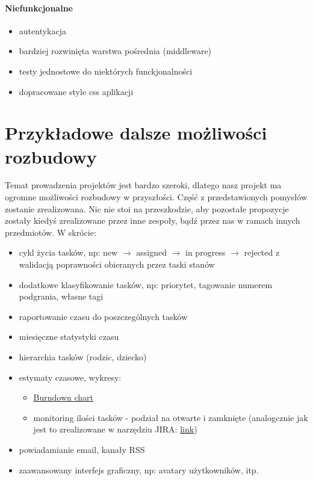 \documentclass[a4paper,12pt,notitlepage]{mwrep}
\begin{document}
\paragraph{Niefunkcjonalne}
\begin{itemize}
	\item	autentykacja
	\item	bardziej rozwinięta warstwa pośrednia (middleware)
	\item	testy jednostowe do niektórych funckjonalności
	\item	dopracowane style css aplikacji
\end{itemize}




\section{Przykładowe dalsze możliwości rozbudowy}
Temat prowadzenia projektów jest bardzo szeroki, dlatego nasz projekt ma ogromne możliwości
rozbudowy w przyszłości. Część z przedstawionych pomysłów zostanie zrealizowana.
Nic nie stoi na przeszkodzie, aby pozostałe propozycje zostały kiedyś zrealizowane przez
inne zespoły, bądź przez nas w ramach innych przedmiotów. W skrócie:
\begin{itemize}
	\item	cykl życia tasków, np: new $\rightarrow$ assigned $\rightarrow$ in progress $\rightarrow$ rejected
			z walidacją poprawności obieranych przez taski stanów
	\item	dodatkowe klasyfikowanie tasków, np: priorytet, tagowanie numerem podgrania, własne tagi
	\item	raportowanie czasu do poszczególnych tasków
	\item	miesięczne statystyki czasu
	\item	hierarchia tasków (rodzic, dziecko)
	\item	estymaty czasowe, wykresy:
			\begin{itemize}
				\item	\href{http://www.youtube.com/watch?v=XU0llRltyFM&t=4m29s}{Burndown chart}
				\item	monitoring ilości tasków - podział na otwarte i zamknięte (analogcznie jak jest to zrealizowane w narzędziu JIRA:
						\href{https://confluence.atlassian.com/download/attachments/185729486/gadgets-charting-created-vs-resolved.png?version=2&modificationDate=1350347163816&api=v2}{link})
			\end{itemize}
	\item	powiadamianie email, kanały RSS
	\item	zaawansowany interfejs graficzny, np: avatary użytkowników, itp.
\end{itemize}
\end{document}

